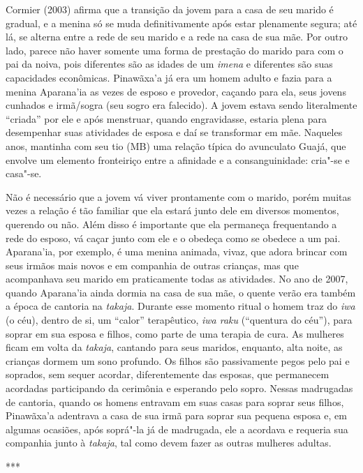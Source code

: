 Cormier (2003) afirma que a transição da jovem para a casa de seu marido
é gradual, e a menina só se muda definitivamente após estar plenamente
segura; até lá, se alterna entre a rede de seu marido e a rede na casa
de sua mãe. Por outro lado, parece não haver somente uma forma de
prestação do marido para com o pai da noiva, pois diferentes são as
idades de um \emph{imena} e diferentes são suas capacidades econômicas.
Pinawãxa'a já era um homem adulto e fazia para a menina Aparana'ia as
vezes de esposo e provedor, caçando para ela, seus jovens cunhados e
irmã/sogra (seu sogro era falecido). A jovem estava sendo literalmente
``criada'' por ele e após menstruar, quando engravidasse, estaria plena
para desempenhar suas atividades de esposa e daí se transformar em mãe.
Naqueles anos, mantinha com seu tio (MB) uma relação típica do
avunculato Guajá, que envolve um elemento fronteiriço entre a afinidade
e a consanguinidade: cria"-se e casa"-se.

Não é necessário que a jovem vá viver prontamente com o marido, porém
muitas vezes a relação é tão familiar que ela estará junto dele em
diversos momentos, querendo ou não. Além disso é importante que ela
permaneça frequentando a rede do esposo, vá caçar junto com ele e o
obedeça como se obedece a um pai. Aparana'ia, por exemplo, é uma menina
animada, vivaz, que adora brincar com seus irmãos mais novos e em
companhia de outras crianças, mas que acompanhava seu marido em
praticamente todas as atividades. No ano de 2007, quando Aparana'ia
ainda dormia na casa de sua mãe, o quente verão era também a época de
cantoria na \emph{takaja}. Durante esse momento ritual o homem traz do
\emph{iwa} (o céu), dentro de si, um ``calor'' terapêutico, \emph{iwa
raku} (``quentura do céu''), para soprar em sua esposa e filhos, como
parte de uma terapia de cura. As mulheres ficam em volta da
\emph{takaja}, cantando para seus maridos, enquanto, alta noite, as
crianças dormem um sono profundo. Os filhos são passivamente pegos pelo
pai e soprados, sem sequer acordar, diferentemente das esposas, que
permanecem acordadas participando da cerimônia e esperando pelo sopro.
Nessas madrugadas de cantoria, quando os homens entravam em suas casas
para soprar seus filhos, Pinawãxa'a adentrava a casa de sua irmã para
soprar sua pequena esposa e, em algumas ocasiões, após soprá"-la já de
madrugada, ele a acordava e requeria sua companhia junto à
\emph{takaja}, tal como devem fazer as outras mulheres adultas.

\begin{center}
***
\end{center}

